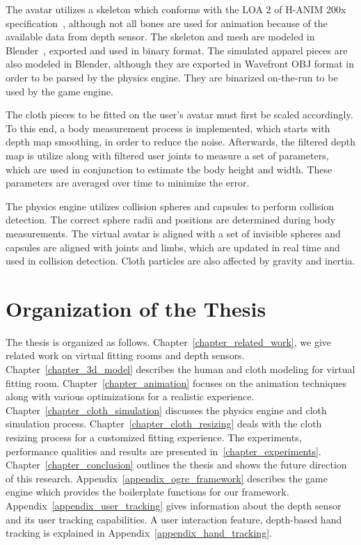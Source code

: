 The avatar utilizes a skeleton which conforms with the LOA 2 of H-ANIM 200x specification~\cite{HANIM}, although not all bones are used for animation because of the available data from depth sensor. The skeleton and mesh are modeled in Blender~\cite{Blender}, exported and used in binary format. The simulated apparel pieces are also modeled in Blender, although they are exported in Wavefront OBJ format in order to be parsed by the physics engine. They are binarized on-the-run to be used by the game engine. 

The cloth pieces to be fitted on the user's avatar must first be scaled accordingly. To this end, a body measurement process is implemented, which starts with depth map smoothing, in order to reduce the noise. Afterwards, the filtered depth map is utilize along with filtered user joints to measure a set of parameters, which are used in conjunction to estimate the body height and width. These parameters are averaged over time to minimize the error.

The physics engine utilizes collision spheres and capsules to perform collision detection. The correct sphere radii and positions are determined during body measurements. The virtual avatar is aligned with a set of invisible spheres and capsules are aligned with joints and limbs, which are updated in real time and used in collision detection. Cloth particles are also affected by gravity and inertia.


\section{Organization of the Thesis}

The thesis is organized as follows. Chapter~\ref{chapter_related_work}, we give related work on virtual fitting rooms and 
depth sensors. Chapter~\ref{chapter_3d_model} describes the human and cloth modeling for virtual fitting room. Chapter~\ref{chapter_animation} focuses on the animation techniques along with various optimizations for a realistic experience. Chapter~\ref{chapter_cloth_simulation} discusses the physics engine and cloth simulation process. Chapter~\ref{chapter_cloth_resizing} deals with the cloth resizing process for a customized fitting experience. The experiments, performance qualities and results are presented in~\ref{chapter_experiments}. Chapter~\ref{chapter_conclusion} outlines the thesis and shows the future direction of this research. Appendix~\ref{appendix_ogre_framework} describes the game engine which provides the boilerplate functions for our framework. Appendix~\ref{appendix_user_tracking} gives information about the depth sensor and its user tracking capabilities. A user interaction feature, depth-based hand tracking is explained in Appendix~\ref{appendix_hand_tracking}.
